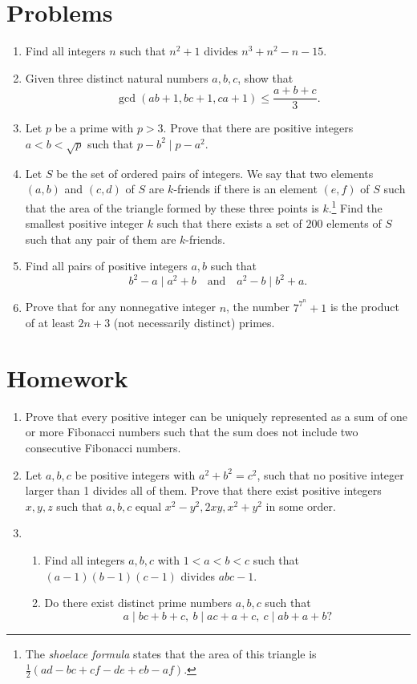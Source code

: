 \documentclass{article}
\begin{document}
\section{Problems}
\begin{enumerate}
	\item Find all integers $n$ such that $n^2+1$ divides $n^3+n^2-n-15$.
	\item Given three distinct natural numbers $a,b,c$, show that
	      \[\gcd(ab+1,bc+1,ca+1)\le\frac{a+b+c}3.\]
	\item Let $p$ be a prime with $p>3$. Prove that there are positive integers
	      $a<b<\sqrt p$ such that $p-b^2\mid p-a^2$.
	\item Let $S$ be the set of ordered pairs of integers. We say that two
	      elements $(a,b)$ and $(c,d)$ of $S$ are $k$-friends if there is an element
	      $(e,f)$ of $S$ such that the area of the triangle formed by these three
	      points is $k$.\footnote{The \emph{shoelace formula} states that the area
		      of this triangle is $\frac12(ad-bc+cf-de+eb-af)$.}
	      Find the smallest positive integer $k$ such that there exists a set of
	      $200$ elements of $S$ such that any pair of them are $k$-friends.
	\item Find all pairs of positive integers $a,b$ such that \[b^2-a\mid
		      a^2+b\quad\text{and}\quad a^2-b\mid b^2+a.\]
	\item Prove that for any nonnegative integer $n$, the number $7^{7^n}+1$ is
	      the product of at least $2n+3$ (not necessarily distinct) primes.
\end{enumerate}
\newpage
\section{Homework}
\begin{enumerate}
	\item Prove that every positive integer can be uniquely represented as a sum
	      of one or more Fibonacci numbers such that the sum does not include two
	      consecutive Fibonacci numbers.
	\item Let $a, b, c$ be positive integers with $a^2+b^2=c^2$, such that no
	      positive integer larger than 1 divides all of them. Prove that
	      there exist positive integers $x,y,z$ such that $a,b,c$ equal
	      $x^2-y^2,2xy,x^2+y^2$ in some order.
	\item
	      \begin{enumerate}
		      \item Find all integers $a,b,c$ with $1<a<b<c$ such that $(a-1)(b-1)(c-1)$
		            divides $abc-1$.
		      \item Do there exist distinct prime numbers $a,b,c$ such that
		            \[a\mid bc+b+c,\ b\mid ac+a+c,\ c\mid ab+a+b?\]
	      \end{enumerate}
\end{enumerate}
\end{document}
